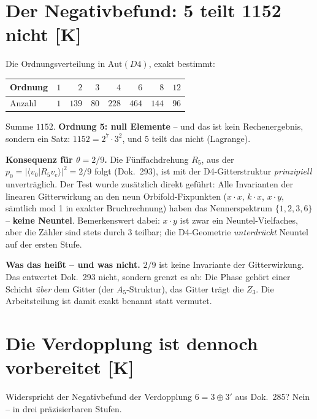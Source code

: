 \documentclass[11pt]{report}
\begin{document}
\chapter{Der Negativbefund: 5 teilt 1152 nicht [K]}

Die Ordnungsverteilung in $\text{Aut}(D4)$, exakt bestimmt:

\begin{center}
\begin{tabular}{lrrrrrrr}
\toprule
Ordnung & $1$ & $2$ & $3$ & $4$ & $6$ & $8$ & $12$ \\
\midrule
Anzahl & $1$ & $139$ & $80$ & $228$ & $464$ & $144$ & $96$ \\
\bottomrule
\end{tabular}
\end{center}

Summe $1152$. \textbf{Ordnung 5: null Elemente} -- und das ist kein
Rechenergebnis, sondern ein Satz: $1152 = 2^7\cdot3^2$, und $5$
teilt das nicht (Lagrange).

\textbf{Konsequenz für $\theta = 2/9$.} Die Fünffachdrehung $R_5$,
aus der $p_0 = |\langle v_0|R_5 v_e\rangle|^2 = 2/9$ folgt
(Dok.~293), ist mit der D4-Gitterstruktur \emph{prinzipiell}
unverträglich. Der Test wurde zusätzlich direkt geführt: Alle
Invarianten der linearen Gitterwirkung an den neun Orbifold-Fixpunkten
($x\!\cdot\!x$, $k\!\cdot\!x$, $x\!\cdot\!y$, sämtlich mod 1 in exakter
Bruchrechnung) haben das Nennerspektrum $\{1,2,3,6\}$ --
\textbf{keine Neuntel}. Bemerkenswert dabei: $x\!\cdot\!y$ ist zwar
ein Neuntel-Vielfaches, aber die Zähler sind stets durch 3 teilbar;
die D4-Geometrie \emph{unterdrückt} Neuntel auf der ersten Stufe.

\textbf{Was das heißt -- und was nicht.} $2/9$ ist keine Invariante
der Gitterwirkung. Das entwertet Dok.~293 nicht, sondern grenzt es
ab: Die Phase gehört einer Schicht \emph{über} dem Gitter (der
$A_5$-Struktur), das Gitter trägt die $Z_3$. Die Arbeitsteilung ist
damit exakt benannt statt vermutet.

\chapter{Die Verdopplung ist dennoch vorbereitet [K]}

Widerspricht der Negativbefund der Verdopplung $6 = 3\oplus3'$ aus
Dok.~285? Nein -- in drei präzisierbaren Stufen.
\end{document}
